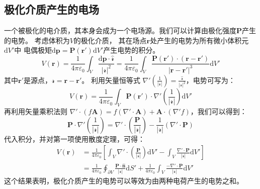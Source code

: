 \documentclass[fontset=none]{ctexart}
\begin{document}
\subsection{极化介质产生的电场}
一个被极化的电介质，其本身会成为一个电场源。我们可以计算由极化强度$\bm{P}$产生的电势。
考虑体积为$V$的极化介质，
其在场点$\bm{r}$处产生的电势为所有微小体积元$\mathrm{d}V'$中
电偶极矩$\mathrm{d}\bm{p} = \bm{P}(\bm{r}')\mathrm{d}V'$产生电势的积分。
\begin{equation}
    V(\bm{r}) = \frac{1}{4\pi\varepsilon_0} \int_V \frac{\mathrm{d}\bm{p} 
    \cdot \hat{\bm{\mathscr{r}}}}{|\bm{\mathscr{r}}|^2} 
    = \frac{1}{4\pi\varepsilon_0} \int_V \frac{\bm{P}(\bm{r}') 
    \cdot (\bm{r}-\bm{r}')}{|\bm{r}-\bm{r}'|^3} \mathrm{d}V'
\end{equation}
其中$\bm{r}'$是源点，$\bm{\mathscr{r}} = \bm{r}-\bm{r}'$。
利用矢量恒等式 $\nabla' \left(\frac{1}{|\bm{\mathscr{r}}|}\right) 
= \frac{\hat{\bm{\mathscr{r}}}}{|\bm{\mathscr{r}}|^2}$，电势可写为：
\begin{equation}
    V(\bm{r}) = \frac{1}{4\pi\varepsilon_0} \int_V \bm{P}(\bm{r}') 
    \cdot \nabla' \left( \frac{1}{|\bm{\mathscr{r}}|} \right) \mathrm{d}V'
\end{equation}
再利用矢量乘积法则 $\nabla' \cdot (f\bm{A}) = f(\nabla' \cdot \bm{A}) 
+ \bm{A} \cdot (\nabla' f)$，我们可以得到：
\begin{equation}
    \bm{P} \cdot \nabla' \left( \frac{1}{|\bm{\mathscr{r}}|} \right) 
    = \nabla' \cdot \left( \frac{\bm{P}}{|\bm{\mathscr{r}}|} \right) 
    - \frac{1}{|\bm{\mathscr{r}}|} (\nabla' \cdot \bm{P})
\end{equation}
代入积分，并对第一项使用散度定理，可得：
\begin{equation}
\begin{aligned}
    V(\bm{r}) &= \frac{1}{4\pi\varepsilon_0} \left[ \int_V \nabla' \cdot 
    \left( \frac{\bm{P}}{|\bm{\mathscr{r}}|} \right) \mathrm{d}V' 
    - \int_V \frac{\nabla' \cdot \bm{P}}{|\bm{\mathscr{r}}|} \mathrm{d}V' \right] \\
    &= \frac{1}{4\pi\varepsilon_0} \oint_{\partial V} \frac{\bm{P} \cdot 
    \hat{\bm{n}}}{|\bm{\mathscr{r}}|} \mathrm{d}S' + \frac{1}{4\pi\varepsilon_0} 
    \int_V \frac{-\nabla' \cdot \bm{P}}{|\bm{\mathscr{r}}|} \mathrm{d}V'
\end{aligned}
\end{equation}
这个结果表明，极化介质产生的电势可以等效为由两种电荷产生的电势之和。
\end{document}
